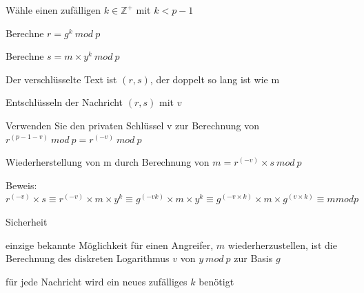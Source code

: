 \documentclass[a4paper]{article}
\begin{document}
\begin{multicols}{3}
\begin{itemize*}
            \begin{itemize*}
                  \item Wähle einen zufälligen $k\in\mathbb{Z}^+$ mit $k< p-1$
                  \item Berechne $r=g^k\ mod\ p$
                  \item Berechne $s=m\times y^k\ mod\ p$
                  \item Der verschlüsselte Text ist $(r,s)$, der doppelt so lang ist wie m
            \end{itemize*}
            \item Entschlüsseln der Nachricht $(r,s)$ mit $v$
            \begin{itemize*}
                  \item Verwenden Sie den privaten Schlüssel v zur Berechnung von $r^{(p-1-v)}\ mod\ p=r^{(-v)}\ mod\ p$
                  \item Wiederherstellung von m durch Berechnung von $m=r^{(-v)}\times s\ mod\ p$
                  \item Beweis: $r^{(-v)}\times s\equiv r^{(-v)} \times m \times y^k\equiv g^{(-vk)}\times m \times y^k\equiv g^{(-v \times k)} \times m\times g^{(v \times k)} \equiv m mod p$
            \end{itemize*}
            \item Sicherheit
            \begin{itemize*}
                  \item einzige bekannte Möglichkeit für einen Angreifer, $m$ wiederherzustellen, ist die Berechnung des diskreten Logarithmus $v$ von $y\ mod\ p$ zur Basis $g$
                  \item für jede Nachricht wird ein neues zufälliges $k$ benötigt
            \end{itemize*}
      \end{itemize*}


\end{multicols}
\end{document}
